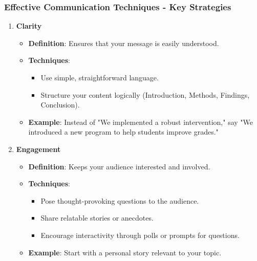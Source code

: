 \documentclass[aspectratio=169]{beamer}
\begin{document}
\begin{frame}[fragile]
    \frametitle{Effective Communication Techniques - Key Strategies}
    \begin{enumerate}
        \item \textbf{Clarity}
            \begin{itemize}
                \item \textbf{Definition}: Ensures that your message is easily understood.
                \item \textbf{Techniques}:
                    \begin{itemize}
                        \item Use simple, straightforward language.
                        \item Structure your content logically (Introduction, Methods, Findings, Conclusion).
                    \end{itemize}
                \item \textbf{Example}: Instead of "We implemented a robust intervention," say "We introduced a new program to help students improve grades."
            \end{itemize}
        
        \item \textbf{Engagement} 
            \begin{itemize}
                \item \textbf{Definition}: Keeps your audience interested and involved.
                \item \textbf{Techniques}:
                    \begin{itemize}
                        \item Pose thought-provoking questions to the audience.
                        \item Share relatable stories or anecdotes.
                        \item Encourage interactivity through polls or prompts for questions.
                    \end{itemize}
                \item \textbf{Example}: Start with a personal story relevant to your topic.
            \end{itemize}
    \end{enumerate}
\end{frame}
\end{document}
